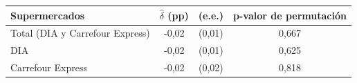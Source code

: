 \begin{tabular}{lccc}
\toprule
Supermercados & $\hat\delta$ (pp) & (e.e.) & p-valor de permutación \\
\midrule
Total (DIA y Carrefour Express) & -0,02 & (0,01) & 0,667 \\
DIA & -0,02 & (0,01) & 0,625 \\
Carrefour Express & -0,02 & (0,02) & 0,818 \\
\bottomrule
\end{tabular}
